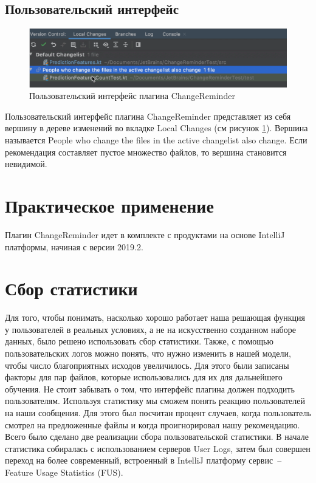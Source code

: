 \subsection{Пользовательский интерфейс}
\begin{figure}[!h]
\caption{Пользовательский интерфейс плагина ChangeReminder}\label{ChangeReminder-ui}
\centering
\includegraphics[scale=0.4]{images/ChangeReminderUI.png}
\end{figure}
Пользовательский интерфейс плагина ChangeReminder представляет из себя вершину в дереве изменений во вкладке Local Changes (см рисунок \ref{ChangeReminder-ui}). Вершина называется People who change the files in the active changelist also change. Если рекомендация составляет пустое множество файлов, то вершина становится невидимой.
\section{Практическое применение}
Плагин ChangeReminder идет в комплекте с продуктами на основе IntelliJ платформы, начиная с версии 2019.2.

\section{Сбор статистики}\label{stats-main}
Для того, чтобы понимать, насколько хорошо работает наша решающая функция у пользователей в реальных условиях, а не на искусственно созданном наборе данных, было решено использовать сбор статистики. Также, с помощью пользовательских логов можно понять, что нужно изменить в нашей модели, чтобы число благоприятных исходов увеличилось. Для этого были записаны факторы для пар файлов, которые использовались для их для дальнейшего обучения. Не стоит забывать о том, что интерфейс плагина должен подходить пользователям. Используя статистику мы сможем понять реакцию пользователей на наши сообщения. Для этого был посчитан процент случаев, когда пользователь смотрел на предложенные файлы и когда проигнорировал нашу рекомендацию. Всего было сделано две реализации сбора пользовательской статистики. В начале статистика собиралась с использованием серверов User Logs, затем был совершен переход на более современный, встроенный в IntelliJ платформу сервис~-- Feature Usage Statistics (FUS).
